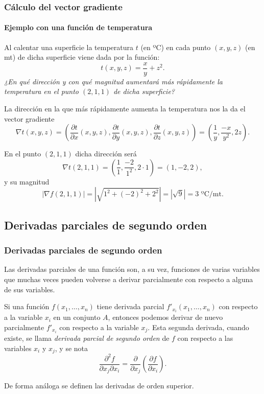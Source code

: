 \begin{frame}
\frametitle{Cálculo del vector gradiente}
\framesubtitle{Ejemplo con una función de temperatura}
Al calentar una superficie la temperatura $t$ (en ºC) en cada punto $(x,y,z)$ (en mt) de dicha superficie viene dada por
la función:
\[ 
t(x,y,z)=\frac{x}{y}+z^2. 
\]
\emph{¿En qué dirección y con qué magnitud aumentará más rápidamente la temperatura en el punto $(2,1,1)$ de dicha superficie?}


La dirección en la que más rápidamente aumenta la temperatura nos la da el vector gradiente 
\[
\nabla t(x,y,z)=\left(\frac{\partial t}{\partial x}(x,y,z),\frac{\partial t}{\partial y}(x,y,z),\frac{\partial t}{\partial
z}(x,y,z)\right)=\left(\frac{1}{y},\frac{-x}{y^2},2z\right).
\]

En el punto $(2,1,1)$ dicha dirección será
\[
\nabla t(2,1,1)=\left(\frac{1}{1},\frac{-2}{1^2},2\cdot 1\right)=(1,-2,2),
\]
y su magnitud 
\[
|\nabla f(2,1,1)|=|\sqrt{1^2+(-2)^2+2^2}|=|\sqrt{9}|=3 \mbox{ ºC/mt}.
\]
\end{frame}


\subsection{Derivadas parciales de segundo orden}
\begin{frame}
\frametitle{Derivadas parciales de segundo orden}
Las derivadas parciales de una función son, a su vez, funciones de varias variables que muchas veces pueden volverse a
derivar parcialmente con respecto a alguna de sus variables. 

Si una función $f(x_1,\ldots,x_n)$ tiene derivada parcial $f'_{x_i}(x_1,\ldots,x_n)$ con respecto a la variable $x_i$ en un conjunto $A$, entonces podemos derivar de nuevo parcialmente $f'_{x_i}$ con respecto a la variable $x_j$. Esta segunda derivada, cuando existe, se llama \emph{derivada parcial de segundo orden} de $f$ con respecto a las variables $x_i$ y $x_j$, y se nota
\[
\frac{\partial ^2 f}{\partial x_j \partial x_i}= \frac{\partial}{\partial x_j}\left(\frac{\partial f}{\partial x_i}\right).
\]

De forma análoga se definen las derivadas de orden superior.
\end{frame}


